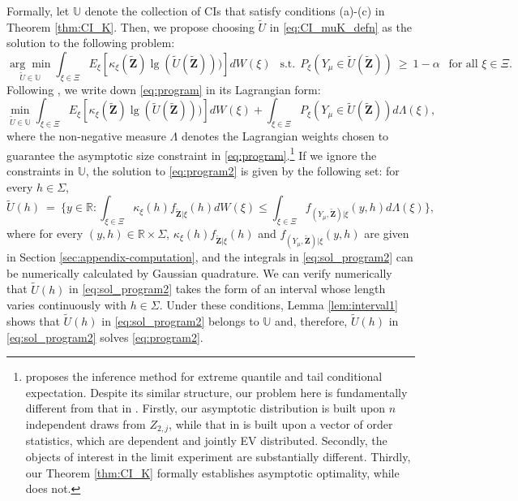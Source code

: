 Formally, let $\mathbb{U}$ denote the collection of CIs that satisfy conditions (a)-(c) in Theorem \ref{thm:CI_K}. Then, we propose choosing $\tilde{U}$ in \eqref{eq:CI_muK_defn} as the solution to the following problem:
\begin{equation}
\underset{\tilde{U} \in \mathbb{U}}{\arg\min} \int_{\xi \in \Xi} E_{\xi }[ \kappa _{\xi }(\tilde{\mathbf{{Z}}})\lg (\tilde{U}(\tilde{\mathbf{{Z}}})))] dW(\xi )~~\text{ s.t.}~~
P_{\xi }( Y_{\mu }\in \tilde{ U}(\mathbf{\tilde{Z}})) ~\geq~ 1-\alpha~~\text{ for all }\xi \in \Xi .
\label{eq:program}
\end{equation}
Following \citet{mullerwang2017}, we write down \eqref{eq:program} in its Lagrangian form:
\begin{equation}
\min_{\tilde{U} \in \mathbb{U}}\int_{\xi \in \Xi} E_{\xi }[ \kappa _{\xi }(\tilde{\mathbf{{Z}}})\lg (\tilde{U}(\tilde{\mathbf{{Z}}})))] dW(\xi )+\int_{\xi \in \Xi}P_{\xi }( Y_{\mu }\in \tilde{ U}(\mathbf{\tilde{Z}})) d\Lambda (\xi ),
\label{eq:program2}
\end{equation}
where the non-negative measure $\Lambda$ denotes the Lagrangian weights chosen to guarantee the asymptotic size constraint in \eqref{eq:program}.\footnote{\citet{mullerwang2017} proposes the inference method for extreme quantile and tail conditional expectation. Despite its similar structure, our problem here is fundamentally different from that in \citet{mullerwang2017}. Firstly, our asymptotic distribution is built upon $n$ independent draws from $Z_{2,j}$, while that in \citet{mullerwang2017} is built upon a vector of order statistics, which are dependent and jointly EV distributed. Secondly, the objects of interest in the limit experiment are substantially different. Thirdly, our Theorem \ref{thm:CI_K} formally establishes asymptotic optimality, while \citet{mullerwang2017} does not.}
If we ignore the constraints in $\mathbb{U}$, the solution to \eqref{eq:program2} is given by the following set: for every $h \in \Sigma$,
\begin{equation}
\tilde{U}(h) ~=~ \bigg\{ y \in \mathbb{R} : \int_{\xi \in \Xi} \kappa_{\xi}(h)f_{\tilde{\mathbf{Z}}|\xi}(h) dW(\xi) \leq \int_{\xi \in \Xi} f_{(Y_{\mu},\tilde{\mathbf{Z}})|\xi}(y,h) d\Lambda(\xi) \bigg\}, \label{eq:sol_program2}
\end{equation}
where for every $(y,h) \in \mathbb{R} \times \Sigma$, $\kappa_{\xi}(h)f_{\tilde{\mathbf{Z}}|\xi}(h)$ and $f_{(Y_{\mu},\tilde{\mathbf{Z}})|\xi}(y,h)$ are given in Section \ref{sec:appendix-computation}, and the integrals in \eqref{eq:sol_program2} can be numerically calculated by Gaussian quadrature. We can verify numerically that $\tilde{U}(h) $ in \eqref{eq:sol_program2} takes the form of an interval whose length varies continuously with $h \in \Sigma$. %
Under these conditions, Lemma \ref{lem:interval1} shows that $\tilde{U}(h)$ in \eqref{eq:sol_program2} belongs to $\mathbb{U}$ and, therefore, $\tilde{U}(h)$ in \eqref{eq:sol_program2} solves \eqref{eq:program2}.

